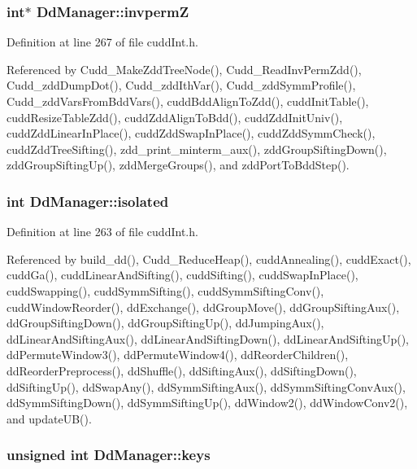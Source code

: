 \subsubsection{\setlength{\rightskip}{0pt plus 5cm}int$\ast$ \bf{Dd\-Manager::invperm\-Z}}\label{structDdManager_4d73e6913b795a8ce7a75d2ff3724f2a}




Definition at line 267 of file cudd\-Int.h.

Referenced by Cudd\_\-Make\-Zdd\-Tree\-Node(), Cudd\_\-Read\-Inv\-Perm\-Zdd(), Cudd\_\-zdd\-Dump\-Dot(), Cudd\_\-zdd\-Ith\-Var(), Cudd\_\-zdd\-Symm\-Profile(), Cudd\_\-zdd\-Vars\-From\-Bdd\-Vars(), cudd\-Bdd\-Align\-To\-Zdd(), cudd\-Init\-Table(), cudd\-Resize\-Table\-Zdd(), cudd\-Zdd\-Align\-To\-Bdd(), cudd\-Zdd\-Init\-Univ(), cudd\-Zdd\-Linear\-In\-Place(), cudd\-Zdd\-Swap\-In\-Place(), cudd\-Zdd\-Symm\-Check(), cudd\-Zdd\-Tree\-Sifting(), zdd\_\-print\_\-minterm\_\-aux(), zdd\-Group\-Sifting\-Down(), zdd\-Group\-Sifting\-Up(), zdd\-Merge\-Groups(), and zdd\-Port\-To\-Bdd\-Step().
\subsubsection{\setlength{\rightskip}{0pt plus 5cm}int \bf{Dd\-Manager::isolated}}\label{structDdManager_0407971624e8cbb0510be72840e1788b}




Definition at line 263 of file cudd\-Int.h.

Referenced by build\_\-dd(), Cudd\_\-Reduce\-Heap(), cudd\-Annealing(), cudd\-Exact(), cudd\-Ga(), cudd\-Linear\-And\-Sifting(), cudd\-Sifting(), cudd\-Swap\-In\-Place(), cudd\-Swapping(), cudd\-Symm\-Sifting(), cudd\-Symm\-Sifting\-Conv(), cudd\-Window\-Reorder(), dd\-Exchange(), dd\-Group\-Move(), dd\-Group\-Sifting\-Aux(), dd\-Group\-Sifting\-Down(), dd\-Group\-Sifting\-Up(), dd\-Jumping\-Aux(), dd\-Linear\-And\-Sifting\-Aux(), dd\-Linear\-And\-Sifting\-Down(), dd\-Linear\-And\-Sifting\-Up(), dd\-Permute\-Window3(), dd\-Permute\-Window4(), dd\-Reorder\-Children(), dd\-Reorder\-Preprocess(), dd\-Shuffle(), dd\-Sifting\-Aux(), dd\-Sifting\-Down(), dd\-Sifting\-Up(), dd\-Swap\-Any(), dd\-Symm\-Sifting\-Aux(), dd\-Symm\-Sifting\-Conv\-Aux(), dd\-Symm\-Sifting\-Down(), dd\-Symm\-Sifting\-Up(), dd\-Window2(), dd\-Window\-Conv2(), and update\-UB().
\subsubsection{\setlength{\rightskip}{0pt plus 5cm}unsigned int \bf{Dd\-Manager::keys}}\label{structDdManager_faedd101dfa7b7e2cb11614647ec37b2}




